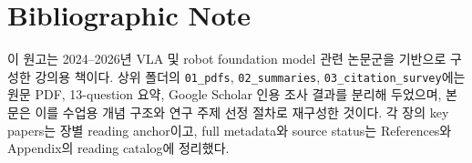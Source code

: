 \documentclass[11pt,a4paper,openany,twoside]{book}
\begin{document}
\backmatter
\chapter*{Bibliographic Note}
이 원고는 2024--2026년 VLA 및 robot foundation model 관련 논문군을 기반으로 구성한 강의용 책이다. 상위 폴더의 \texttt{01\_pdfs}, \texttt{02\_summaries}, \texttt{03\_citation\_survey}에는 원문 PDF, 13-question 요약, Google Scholar 인용 조사 결과를 분리해 두었으며, 본문은 이를 수업용 개념 구조와 연구 주제 선정 절차로 재구성한 것이다. 각 장의 key papers는 장별 reading anchor이고, full metadata와 source status는 References와 Appendix의 reading catalog에 정리했다.

\nocite{saycan,rt1,rt2,palme,diffusionpolicy,aloha,openx,libero,octo,openvla,pi0,pi05,openvlaoft,fast,vqvla,smolvla,grootn1,helix,geminirobotics,geminiroboticser,worldvla,vlaos,robotwin2,worldpilot2026,lawam2026,ahawam2026,regenwam2026,oscar2026,cosmos3,roadvla2026,forcevla2026,actioncontrolnet2026,unifs2026,liberosafety2026,foresightsafety2026,foresight2026,physreflectvla2026,vlawatermark2026,labvla2026,musevla2026,aceego2026,la4vla2026,equivla2026}


\end{document}

